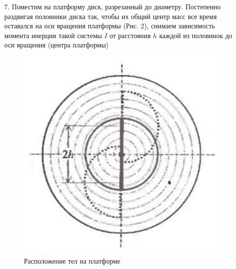\documentclass[a4paper,12pt]{article} %
\begin{document}
\begin{itemize}
\item[7.] Поместим на платформу диск, разрезанный до диаметру. Постепенно раздвигая половинки диска так, чтобы их общий центр масс все время оставался на оси вращения платформы (Рис. 2), снимаем зависимость момента инерции такой системы $I$ от расстояния $h$ каждой из половинок до оси вращения (центра платформы)
\begin{figure}[h]
\centering
\includegraphics[scale=0.5]{2}
\caption{Расположение тел на платформе}
\end{figure}
\end{itemize}
\end{document}
